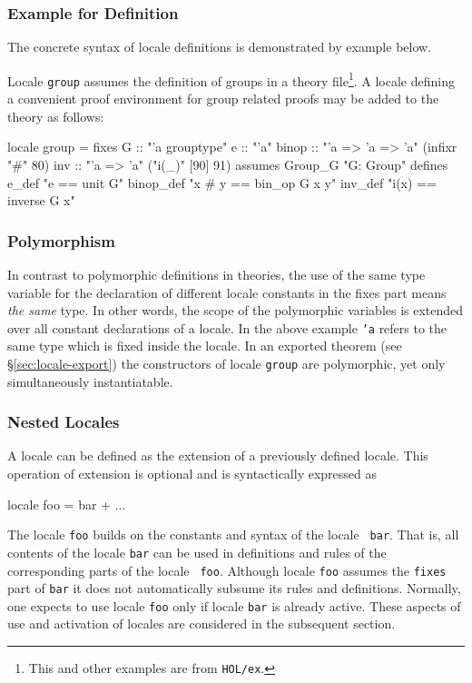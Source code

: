 \subsubsection{Example for Definition}
The concrete syntax of locale definitions is demonstrated by example below.

Locale \texttt{group} assumes the definition of groups in a theory
file\footnote{This and other examples are from \texttt{HOL/ex}.}.  A locale
defining a convenient proof environment for group related proofs may be
added to the theory as follows:
\begin{ttbox}
  locale group =
    fixes 
      G         :: "'a grouptype"
      e         :: "'a"
      binop     :: "'a => 'a => 'a"        (infixr "#" 80)
      inv       :: "'a => 'a"              ("i(_)" [90] 91)
    assumes
      Group_G   "G: Group"
    defines
      e_def     "e == unit G"
      binop_def "x # y == bin_op G x y"
      inv_def   "i(x) == inverse G x"
\end{ttbox}

\subsubsection{Polymorphism}

In contrast to polymorphic definitions in theories, the use of the
same type variable for the declaration of different locale constants in the
fixes part means \emph{the same} type.  In other words, the scope of the
polymorphic variables is extended over all constant declarations of a locale.
In the above example \texttt{'a} refers to the same type which is fixed inside
the locale.  In an exported theorem (see \S\ref{sec:locale-export}) the
constructors of locale \texttt{group} are polymorphic, yet only simultaneously
instantiatable.

\subsubsection{Nested Locales}

A locale can be defined as the extension of a previously defined
locale.  This operation of extension is optional and is syntactically
expressed as 
\begin{ttbox}
locale foo = bar + ...
\end{ttbox}
The locale \texttt{foo} builds on the constants and syntax of the locale {\tt
bar}.  That is, all contents of the locale \texttt{bar} can be used in
definitions and rules of the corresponding parts of the locale {\tt
foo}.  Although locale \texttt{foo} assumes the \texttt{fixes} part of \texttt{bar} it
does not automatically subsume its rules and definitions.  Normally, one
expects to use locale \texttt{foo} only if locale \texttt{bar} is already
active.  These aspects of use and activation of locales are considered in the
subsequent section.


